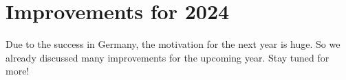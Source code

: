 \section{Improvements for 2024}
Due to the success in Germany, the motivation for the next year is huge. So we already discussed
many improvements for the upcoming year. 
\newline
Stay tuned for more!